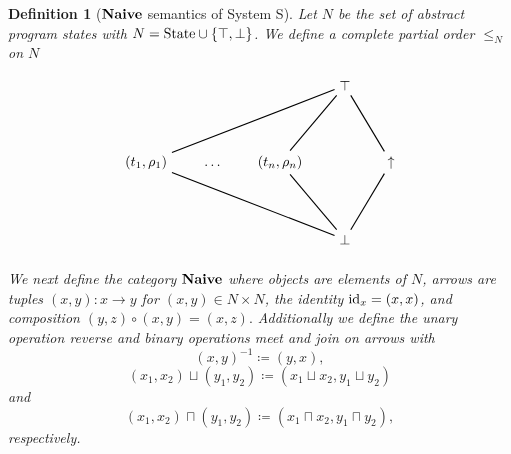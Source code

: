 \documentclass{article}
\newtheorem{definition}[theorem]{Definition}
\newcommand{\fail}{\ensuremath \text{$\uparrow$}}
\newcommand{\State}{\ensuremath \text{State}}
\newcommand{\id}{\ensuremath \operatorname{id}}
\newcommand{\Naive}{\ensuremath \mathbf{Naive}}
\begin{document}
\begin{definition}[$\Naive$ semantics of System S] \normalfont
  Let $N$ be the set of abstract program states with $N = \State \cup \lbrace \top, \bot \rbrace$. We define a complete partial order $\leq_N$ on $N$
  \[
    \begin{tikzpicture}
     \matrix (m) [matrix of math nodes, row sep=4em, column sep=2em]
    {              &        &             & \top &       \\
      (t_1,\rho_1) & \ldots & (t_n,\rho_n) &      & \fail \\
                   &        &             & \bot &       \\
    };

    \draw [thick] (m-2-1) -- (m-1-4);
    \draw [thick] (m-2-3) -- (m-1-4);
    \draw [thick] (m-2-5) -- (m-1-4);
    \draw [thick] (m-3-4) -- (m-2-1);
    \draw [thick] (m-3-4) -- (m-2-3);
    \draw [thick] (m-3-4) -- (m-2-5);
    \end{tikzpicture}
  \]

  We next define the category $\Naive$ where objects are elements of $N$, arrows are tuples $(x,y) : x \rightarrow y$ for $(x,y) \in N \times N$, the identity $\id_x = (x,x)$, and  composition $(y,z) \circ (x,y) = (x,z).$ Additionally we define the unary operation \emph{reverse} and binary operations \emph{meet} and \emph{join} on arrows with \[(x,y)^{-1} \coloneqq (y,x),\] \[ (x_1,x_2) \sqcup (y_1,y_2) \coloneqq (x_1 \sqcup x_2, y_1 \sqcup y_2) \] and \[ (x_1,x_2) \sqcap (y_1,y_2) \coloneqq (x_1 \sqcap x_2, y_1 \sqcap y_2), \] respectively.
\end{definition}
\end{document}

